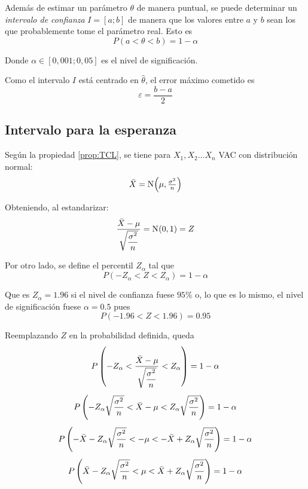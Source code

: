 \documentclass[a5paper,12pt,twoside]{book}
\begin{document}
Además de estimar un parámetro $\theta$ de manera puntual, se puede determinar un \emph{intervalo de confianza} $I=[a;b]$ de manera que los valores entre $a$ y $b$ sean los que probablemente tome el parámetro real. Esto es
\begin{equation*}
    P(a<\theta<b) = 1 - \alpha
\end{equation*}

Donde $\alpha \in [0,001 ; 0,05]$ es el nivel de significación.

Como el intervalo $I$ está centrado en $\hat{\theta}$, el error máximo cometido es
\begin{equation*}
    \varepsilon = \frac{b-a}{2}
\end{equation*}


\subsection{Intervalo para la esperanza}

Según la propiedad \ref{prop:TCL}, se tiene para $X_1, X_2 \dots X_n$ VAC con distribución normal:
\begin{equation*}
    \ave{X} = \fx[\nor]{\mu, \tfrac{\sigma^2}{n}}
\end{equation*}

Obteniendo, al estandarizar:
\begin{equation*}
    \frac{\ave{X}-\mu}{\sqrt{\dfrac{\sigma^2}{n}}} = \fx[\nor]{0,1} = Z
\end{equation*}

Por otro lado, se define el percentil $Z_\alpha$ tal que
\begin{equation*}
    P(-Z_\alpha<Z<Z_\alpha) = 1 - \alpha
\end{equation*}

Que es $Z_\alpha=1.96$ si el nivel de confianza fuese $95\%$ o, lo que es lo mismo, el nivel de significación fuese $\alpha=0.5$ pues
\begin{equation*}
    P(-1.96<Z<1.96) = 0.95
\end{equation*}

Reemplazando $Z$ en la probabilidad definida, queda
\begin{gather*}
    P \bb{ -Z_\alpha < \frac{\ave{X}-\mu}{\sqrt{\dfrac{\sigma^2}{n}}} < Z_\alpha } = 1 - \alpha
    \\[1ex]
    P \bb{ - Z_\alpha \sqrt{\frac{\sigma^2}{n}} < \ave{X} - \mu < Z_\alpha \sqrt{\frac{\sigma^2}{n}} } = 1 - \alpha
    \\[1ex]
    P \bb{ - \ave{X} - Z_\alpha \sqrt{\frac{\sigma^2}{n}} < -\mu < - \ave{X} + Z_\alpha \sqrt{\frac{\sigma^2}{n}} } = 1 - \alpha
    \\[1ex]
    P \bb{ \ave{X} - Z_\alpha \sqrt{\frac{\sigma^2}{n}} < \mu < \ave{X} + Z_\alpha \sqrt{\frac{\sigma^2}{n}} } = 1 - \alpha
\end{gather*}
\end{document}
